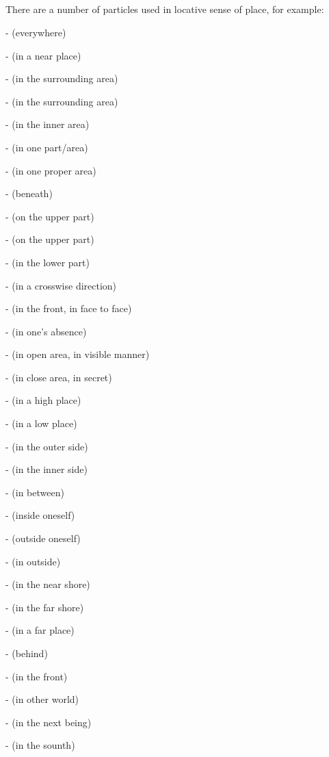 \subsection*{}\label{nip:inplace}
There are a number of particles used in locative sense of place, for example:\par
-  (everywhere) \par
-  (in a near place) \par
-  (in the surrounding area) \par
-  (in the surrounding area) \par
-  (in the inner area) \par
-  (in one part/area) \par
-  (in one proper area) \par
-  (beneath) \par
-  (on the upper part) \par
-  (on the upper part) \par
-  (in the lower part) \par
-  (in a crosswise direction) \par
-  (in the front, in face to face) \par
-  (in one's absence) \par
-  (in open area, in visible manner) \par
-  (in close area, in secret) \par
-  (in a high place) \par
-  (in a low place) \par
-  (in the outer side) \par
-  (in the inner side) \par
-  (in between) \par
-  (inside oneself) \par
-  (outside oneself) \par
-  (in outside) \par
-  (in the near shore) \par
-  (in the far shore) \par
-  (in a far place) \par
-  (behind) \par
-  (in the front) \par
-  (in other world) \par
-  (in the next being) \par
-  (in the sounth) \par

